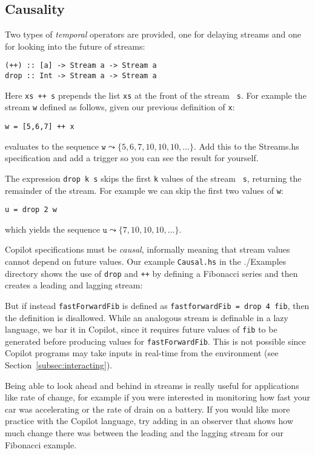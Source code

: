 \subsection{Causality} 
Two types of \emph{temporal} operators are provided, one for delaying streams and one for
looking into the future of streams:
%
\begin{lstlisting}[language = Copilot, frame = single]
(++) :: [a] -> Stream a -> Stream a
drop :: Int -> Stream a -> Stream a
\end{lstlisting}
%
Here {\tt xs ++ s} prepends the list {\tt xs} at the front of the stream {\tt
s}.
%
For example the stream {\tt w} defined as follows, given our previous
definition of {\tt x}:
%
\begin{lstlisting}[language = Copilot, frame = single]
w = [5,6,7] ++ x
\end{lstlisting}
%
evaluates to the sequence $\mathtt{w} \leadsto \{5, 6, 7, 10, 10, 10, \dots\}$.
%
Add this to the Streams.hs specification and add a trigger so you can see the
result for yourself.

The expression {\tt drop k s} skips the first {\tt k} values of the stream {\tt
s}, returning the remainder of the stream.
%
For example we can skip the first two values of {\tt w}:
%
\begin{lstlisting}[language = Copilot, frame = single]
u = drop 2 w
\end{lstlisting}
%
which yields the sequence $\mathtt{u} \leadsto \{7, 10, 10, 10, \dots\}$.

Copilot specifications must be \emph{causal}, informally meaning that stream
values cannot depend on future values.
%
Our example \texttt{Causal.hs} in the ./Examples directory shows the use of
{\tt drop} and {\tt ++} by defining a Fibonacci series and then creates a
leading and lagging stream:
%

%

But if instead {\tt fastForwardFib} is defined as {\tt fastforwardFib = drop 4
fib}, then the definition is disallowed.
%
While an analogous stream is definable in a lazy language, we bar it in
Copilot, since it requires future values of {\tt fib} to be generated before
producing values for {\tt fastForwardFib}.
%
This is not possible since Copilot programs may take inputs in real-time from
the environment (see Section~\ref{subsec:interacting}).

Being able to look ahead and behind in streams is really useful for applications like
rate of change, for example if you were interested in monitoring how fast your car was
accelerating or the rate of drain on a battery.
%
If you would like more practice with the Copilot language, try adding in an
observer that shows how much change there was between the leading and the
lagging stream for our Fibonacci example.
%
